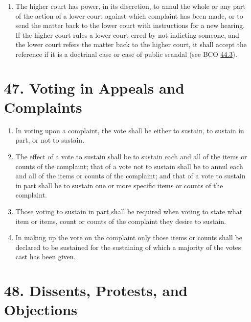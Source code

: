 \documentclass[
]{book}
\providecommand{\tightlist}{%
  \setlength{\itemsep}{0pt}\setlength{\parskip}{0pt}}
\begin{document}
\begin{enumerate}
\item
  The higher court has power, in its discretion, to annul the whole or any part of the action of a lower court against which complaint has been made, or to send the matter back to the lower court with instructions for a new hearing. If the higher court rules a lower court erred by not indicting someone, and the lower court refers the matter back to the higher court, it shall accept the reference if it is a doctrinal case or case of public scandal (see BCO \protect\hyperlink{44.3}{44.3}).
\end{enumerate}

\hypertarget{voting-in-appeals-and-complaints}{%
\section*{47. Voting in Appeals and Complaints}\label{voting-in-appeals-and-complaints}}

\protect\hypertarget{chapter-slug-47-voting-in-appeals-and-complaints}{\href{}{}}

\begin{enumerate}
\def\labelenumi{\arabic{enumi}.}
\tightlist
\item
  \protect\hypertarget{47}{\href{}{}}In voting upon a complaint, the vote shall be either to sustain, to sustain in part, or not to sustain.
\item
  The effect of a vote to sustain shall be to sustain each and all of the items or counts of the complaint; that of a vote not to sustain shall be to annul each and all of the items or counts of the complaint; and that of a vote to sustain in part shall be to sustain one or more specific items or counts of the complaint.
\item
  Those voting to sustain in part shall be required when voting to state what item or items, count or counts of the complaint they desire to sustain.
\item
  In making up the vote on the complaint only those items or counts shall be declared to be sustained for the sustaining of which a majority of the votes cast has been given.
\end{enumerate}

\hypertarget{dissents-protests-and-objections}{%
\section*{48. Dissents, Protests, and Objections}\label{dissents-protests-and-objections}}
\end{document}
